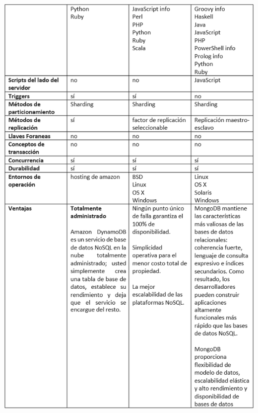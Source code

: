 \documentclass[twoside,onecolumn]{article}
\begin{document}
\begin{flushright}
\begin{itemize}
\includegraphics[scale=0.7]{Imagenes/tabla2.png}
\textbf{}\\

\end{itemize}
\end{flushright}
\end{document}
